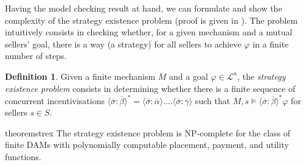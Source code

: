 \documentclass[letterpaper]{article} %
\theoremstyle{definition}
\newtheorem{definition}{Definition}
\newtheorem{theorem}{Theorem}
\newcommand{\munyque}[1]{{[\color{red}#1]}}
\begin{document}
Having the model checking result at hand, we can formulate and show the complexity of the strategy existence problem (proof is given in \cite{diffusionlogic}). The problem intuitively consists in checking whether, for a given mechanism and a mutual sellers' goal, %
there is a way (a strategy) for all sellers to achieve $\varphi$ in a finite number of steps. 

\begin{definition}
    Given a finite mechanism $M$ and a goal $\varphi \in \mathcal{L}^n$, the \emph{strategy existence problem} consists in determining whether there is a finite sequence of concurrent incentivisations $\langle \overline{\sigma}: \overline{\beta} \rangle^\ast = \langle \overline{\sigma}: \overline{\alpha} \rangle .... \langle \overline{\sigma}: \overline{\gamma} \rangle$ such that $M,s \models \langle \overline{\sigma}: \overline{\beta} \rangle^\ast \varphi$ for sellers $s \in S$.   
\end{definition}
\begin{restatable}{theorem}{strex}
\label{thm:strex}
    The strategy existence problem is NP-complete for the class of finite DAMs with polynomially computable placement, payment, and utility functions. %
\end{restatable}
\iffalse
\end{document}
